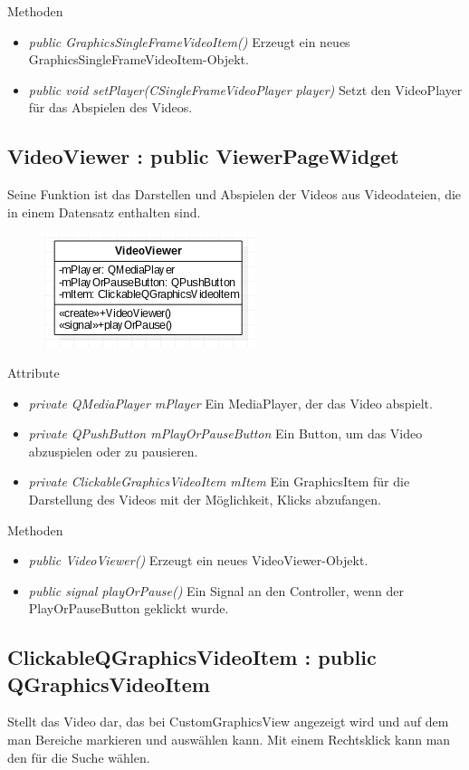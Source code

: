Methoden
\begin{itemize}
	\item\textit{public GraphicsSingleFrameVideoItem()} 
	Erzeugt ein neues GraphicsSingleFrameVideoItem-Objekt.
	\item\textit{public void setPlayer(CSingleFrameVideoPlayer player)} 
	Setzt den VideoPlayer für das Abspielen des Videos.
\end{itemize}

\subsection*{VideoViewer : public ViewerPageWidget}
Seine Funktion ist das Darstellen und Abspielen der Videos aus Videodateien, die in einem Datensatz enthalten sind.

\begin{figure}[H]
	\centering
	\includegraphics[scale=0.5]{img/Klassendiagramm/Klassen/View/VideoViewer}
	\label{fig:videoViewer}
\end{figure}

Attribute
\begin{itemize}
	\item\textit{private QMediaPlayer mPlayer} 
	Ein MediaPlayer, der das Video abspielt. 
	\item\textit{private QPushButton mPlayOrPauseButton} 
	Ein Button, um das Video abzuspielen oder zu pausieren.
	\item\textit{private ClickableGraphicsVideoItem mItem} 
	Ein GraphicsItem für die Darstellung des Videos mit der Möglichkeit, Klicks abzufangen.     
\end{itemize}
\pagebreak
Methoden
\begin{itemize}
	\item\textit{public VideoViewer()} 
	Erzeugt ein neues VideoViewer-Objekt.
	\item\textit{public signal playOrPause()} 
	Ein Signal an den Controller, wenn der PlayOrPauseButton geklickt wurde.
\end{itemize} 

\subsection*{ClickableQGraphicsVideoItem : public QGraphicsVideoItem}
Stellt das Video dar, das bei CustomGraphicsView angezeigt wird und auf dem man Bereiche markieren und  auswählen kann. Mit einem Rechtsklick kann man den  für die Suche wählen.


